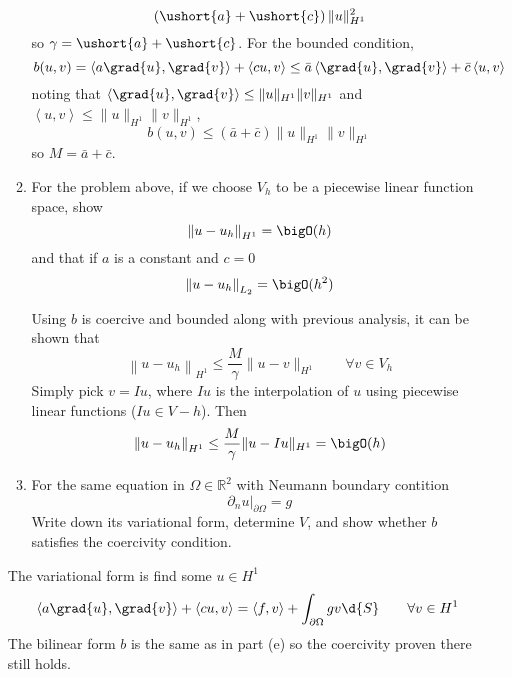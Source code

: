 \documentclass{article}
\newcommand\NoIndent[1]{%
  \begingroup
  \par
  \parshape0
  #1\par
  \endgroup
}
\begin{document}
\begin{enumerate}
\begin{enumerate}
{\begin{equation*}
			\left(\ushort{a}+\ushort{c}\right)\|u\|_{H^1}^2
	\end{equation*}
	so $\gamma = \ushort{a}+\ushort{c}$.
	For the bounded condition,
	\begin{equation*}
		b(u,v) = \left<a\grad{u},\grad{v}\right> + \left<cu,v\right> \leq
			\bar{a}\left<\grad{u},\grad{v}\right> + \bar{c}\left<u,v\right>
	\end{equation*}
	noting that $\left<\grad{u},\grad{v}\right> \leq \|u\|_{H^1}\|v\|_{H^1}$
	and $\left<u,v\right> \leq \|u\|_{H^1}\|v\|_{H^1}$,
	\begin{equation*}
		b(u,v) \leq \left(\bar{a}+\bar{c}\right)\|u\|_{H^1}\|v\|_{H^1}
	\end{equation*}
	so $M = \bar{a}+\bar{c}$.
}
			\item For the problem above, if we choose $V_h$ to be a piecewise linear function space, show
				\begin{equation*}
					\left\|u - u_h\right\|_{H^1} = \bigO(h)
				\end{equation*}
				and that if $a$ is a constant and $c = 0$
				\begin{equation*}
					\left\|u - u_h\right\|_{L_2} = \bigO(h^2)
				\end{equation*}
\NoIndent{
	Using $b$ is coercive and bounded along with previous analysis, it can be shown that
	\begin{equation*}
		\left\|u - u_h\right\|_{H^1} \leq \frac{M}{\gamma}\|u - v\|_{H^1} \qquad \forall v \in V_h
	\end{equation*}
	Simply pick $v = Iu$, where $Iu$ is the interpolation of $u$
	using piecewise linear functions ($Iu \in V-h$).
	Then
	\begin{equation*}
		\left\|u - u_h\right\|_{H^1} \leq \frac{M}{\gamma}\|u - Iu\|_{H^1} = \bigO(h)
	\end{equation*}
}
			\item For the same equation in $\Omega \in \mathbb{R}^2$ with Neumann boundary contition
				\begin{equation*}
					\left.\partial_n u\right|_{\partial\Omega} = g
				\end{equation*}
				Write down its variational form, determine $V$,
				and show whether $b$ satisfies the coercivity condition.
		\end{enumerate}
\NoIndent{
	The variational form is find some $u \in H^1$
	\begin{equation*}
		\left<a\grad{u},\grad{v}\right> + \left<cu,v\right> = \left<f,v\right> + \int_{\partial\Omega}gv\d{S} \qquad \forall v \in H^1
	\end{equation*}
	The bilinear form $b$ is the same as in part (e) so the coercivity proven there still holds.
}


\end{enumerate}
\end{document}
